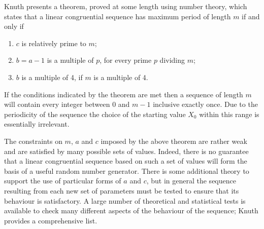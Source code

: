 \documentclass[dvips]{article}
\begin{document}
Knuth \cite{knuth} presents a theorem, proved at some length using number
theory, which states that
a linear congruential sequence has maximum period of length $m$ if and
only if
\begin{enumerate}
\item{$c$ is relatively prime to $m$;}
\item{$b=a-1$ is a multiple of $p$, for every prime $p$ dividing $m$;}
\item{$b$ is a multiple of 4, if $m$ is a multiple of 4.}
\end{enumerate}
If the conditions indicated by the theorem
are met then a sequence of length $m$ will contain every integer between
$0$ and $m-1$ inclusive exactly once.  Due to the periodicity of the
sequence the choice of
the starting value $X_{0}$ within this range is essentially irrelevant.

The constraints on $m$, $a$ and $c$ imposed by the above theorem are
rather weak and are satisfied by many possible sets of values.  Indeed,
there is
no guarantee that a linear congruential sequence based on such a set of
values will
form the basis of a useful random number generator.  There is some
additional theory \cite{knuth} to support the use of particular forms of
$a$ and $c$, but in general the sequence resulting from each new set of
parameters must be tested to ensure that its behaviour is satisfactory.
A large number of theoretical and statistical
tests is available to check many different aspects of the behaviour of
the sequence; Knuth provides a comprehensive list.
\end{document}
